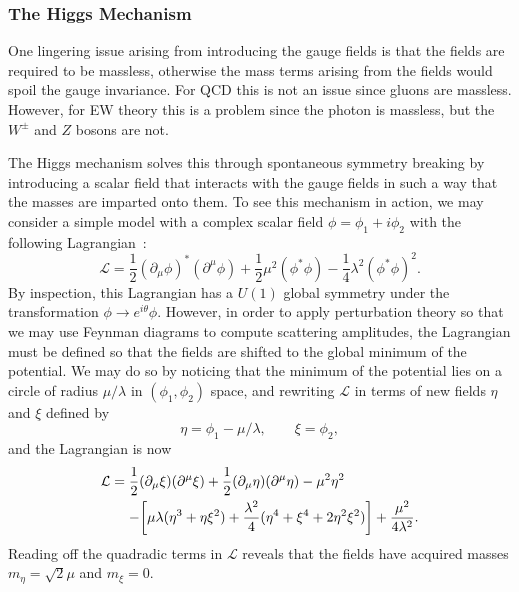 \subsubsection{The Higgs Mechanism}

One lingering issue arising from introducing the gauge fields is that the fields are required to be massless, otherwise the mass terms arising from the fields would spoil the gauge invariance.
For QCD this is not an issue since gluons are massless.
However, for EW theory this is a problem since the photon is massless, but the $W^\pm$ and $Z$ bosons are not.

The Higgs mechanism solves this through spontaneous symmetry breaking by introducing a scalar field that interacts with the gauge fields in such a way that the masses are imparted onto them.
To see this mechanism in action, we may consider a simple model with a complex scalar field $\phi=\phi_1+i\phi_2$ with the following Lagrangian~\cite{GriffithsParticle}:
\begin{equation}
  \mathcal{L}=\frac{1}{2}(\partial_\mu\phi)^*(\partial^\mu\phi)+\frac{1}{2}\mu^2(\phi^*\phi)-\frac{1}{4}\lambda^2(\phi^*\phi)^2.
\end{equation}
By inspection, this Lagrangian has a $U(1)$ global symmetry under the transformation $\phi\to e^{i\theta}\phi$.
However, in order to apply perturbation theory so that we may use Feynman diagrams to compute scattering amplitudes, the Lagrangian must be defined so that the fields are shifted to the global minimum of the potential\footnotemark.
We may do so by noticing that the minimum of the potential lies on a circle of radius $\mu/\lambda$ in $(\phi_1,\phi_2)$ space, and rewriting $\mathcal{L}$ in terms of new fields $\eta$ and $\xi$ defined by
\begin{equation}\label{eq:fields}
  \eta=\phi_1-\mu/\lambda,\qquad \xi=\phi_2,
\end{equation}
and the Lagrangian is now
\begin{equation}
  \begin{aligned}
    \mathcal{L} &= \frac{1}{2}(\partial_\mu\xi)(\partial^\mu\xi)+\frac{1}{2}(\partial_\mu\eta)(\partial^\mu\eta)-\mu^2\eta^2\\
    &\equad- \bqty{\mu\lambda(\eta^3+\eta\xi^2)+\frac{\lambda^2}{4}(\eta^4+\xi^4+2\eta^2\xi^2)}+\frac{\mu^2}{4\lambda^2}.
  \end{aligned}
\end{equation}
Reading off the quadradic terms in $\mathcal{L}$ reveals that the fields have acquired masses $m_\eta=\sqrt{2}\mu$ and $m_\xi=0$.

